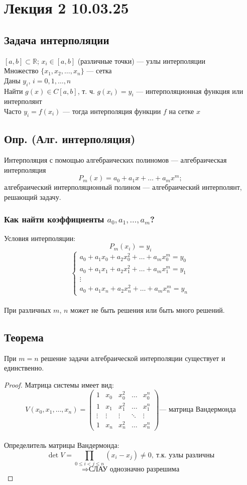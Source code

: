 \section{Лекция 2 10.03.25}

\subsection*{Задача интерполяции}
$[a, b] \subset \mathbb{R}$; $x_i \in [a, b]$ (различные точки) --- узлы интерполяции \\
Множество $\{x_1, x_2, \dots, x_n\}$ --- сетка \\
Даны $y_i$, $i = 0, 1, \dots, n$ \\
Найти $g(x) \in C[a, b]$, т. ч. $g(x_i) = y_i$ --- интерполяционная функция или интерполянт \\
Часто $y_i = f(x_i)$ --- тогда интерполяция функции $f$ на сетке $x$

\subsection*{Опр. (Алг. интерполяция)}
Интерполяция с помощью алгебраических полиномов --- алгебраическая интерполяция 
\[ 
P_m(x) = a_0 + a_1 x + \dots + a_m x^m;
\]
алгебраический интерполяционный полином --- алгебраический интерполянт, решающий задачу.

\subsubsection*{Как найти коэффициенты $a_0, a_1, \dots, a_m$?}
Условия интерполяции:
\[ P_m(x_i) = y_i \]
\[
\begin{cases} 
a_0 + a_1 x_0 + a_2 x_0^2 + \dots + a_m x_0^m = y_0 \\ 
a_0 + a_1 x_1 + a_2 x_1^2 + \dots + a_m x_1^m = y_1 \\ 
\vdots \\
a_0 + a_1 x_n + a_2 x_n^2 + \dots + a_m x_n^m = y_n 
\end{cases}
\] \\
При различных $m$, $n$ может не быть решения или быть много решений.

\subsection*{Теорема}
При $m = n$ решение задачи алгебраической интерполяции существует и единственно.

\begin{proof}
Матрица системы имеет вид:
\[ V(x_0, x_1, \dots, x_n) = \begin{pmatrix} 
1 & x_0 & x_0^2 & \dots & x_0^n \\ 
1 & x_1 & x_1^2 & \dots & x_1^n \\ 
\vdots & \vdots & \vdots & \ddots & \vdots \\ 
1 & x_n & x_n^2 & \dots & x_n^n 
\end{pmatrix} \text{--- матрица Вандермонда} \] \\
Определитель матрицы Вандермонда:
\[ \det V = \prod_{0 \leq i < j \leq n} (x_i - x_j) \neq 0, ~ \text{т.к. узлы различны} \] 
\[ \Rightarrow \text{СЛАУ однозначно разрешима} \]
\end{proof}


